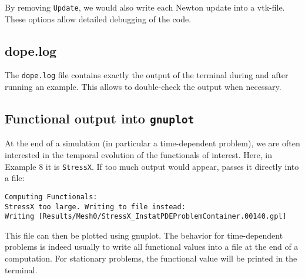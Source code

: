 \begin{remark}
By removing \texttt{Update}, we would also write each Newton update into a
vtk-file.
These options allow detailed debugging of the code.
\end{remark}


\subsection{dope.log}
The \texttt{dope.log} file contains exactly the output of the terminal 
during and after running an example. This allows to double-check the output 
when necessary.


\subsection{Functional output into \texttt{gnuplot}}
At the end of a simulation (in particular a time-dependent problem), we 
are often interested in the temporal evolution of the functionals of interest.
Here, in Example 8 it is \texttt{StressX}. If too much output would appear,
\dope{} passes it directly into a file:
\begin{verbatim}
Computing Functionals:
StressX too large. Writing to file instead: 
Writing [Results/Mesh0/StressX_InstatPDEProblemContainer.00140.gpl]
\end{verbatim}
This file can then be plotted using gnuplot.
The behavior for time-dependent problems is indeed usually to write 
all functional values into a file at the end of a computation.
For stationary problems, the functional value will be printed in the terminal.
